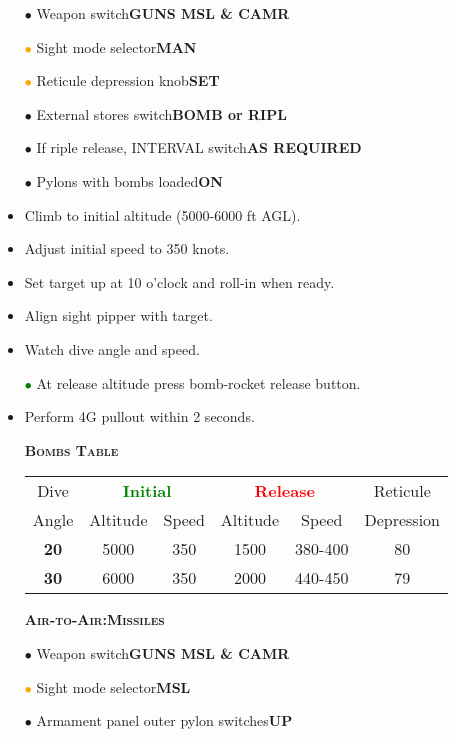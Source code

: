 \documentclass[a4paper,12pt,dvipsnames]{letter}
\newcommand{\button}[1]{\textbf{#1}}
\newcommand{\ok}[1]{\textcolor{Green}{\textbf{#1}}}
\newcommand{\warn}[1]{\textcolor{Red}{\textbf{#1}}}
\newcommand{\myHead}[1]{{\LARGE\textsc{\textbf{#1}}}}
\newcommand{\bi}{\textcolor{ProcessBlue}{$\bullet$\;}}
\newcommand{\gi}{\textcolor{Green}{$\bullet$\;}}
\newcommand{\oi}{\textcolor{Orange}{$\bullet$\;}}
\newcommand{\mcl}[2]{\multicolumn{#1}{|c|}{#2}}
\newcommand{\tb}[1]{\textbf{#1}}
\begin{document}
{\begin{itemize}
 \item[\bi] Weapon switch\dotfill\button{GUNS MSL \& CAMR}
 \item[\oi] Sight mode selector\dotfill\button{MAN}
 \item[\oi] Reticule depression knob\dotfill\button{SET}
 \item[\bi] External stores switch\dotfill\button{BOMB or RIPL}
 \item[\bi] If riple release, INTERVAL switch\dotfill\button{AS REQUIRED}
 \item[\bi] Pylons with bombs loaded\dotfill\button{ON}
 \item Climb to initial altitude (5000-6000 ft AGL).
 \item Adjust initial speed to 350 knots.
 \item Set target up at 10 o'clock and roll-in when ready.
 \item Align sight pipper with target.
 \item Watch dive angle and speed.
 \item[\gi] At release altitude press bomb-rocket release button.
 \item Perform 4G pullout within 2 seconds.
\end{itemize}
\vspace{1em}
\begin{itemize}
 \item[]\myHead{Bombs Table}
 \item[]
\begin{tabular}{c|c|c|c|c|c}
\hline
 Dive   & \mcl{2}{\ok{Initial}} & \mcl{2}{\warn{Release}} & Reticule\\
 Angle  & Altitude & Speed & Altitude & Speed   & Depression\\ \hline
\tb{20} & 5000     & 350   & 1500     & 380-400 & 80        \\ \hline
\tb{30} & 6000     & 350   & 2000     & 440-450 & 79        \\ \hline
\end{tabular}
\end{itemize}
\newpage
\begin{itemize}
 \item[] \myHead{Air-to-Air:\;Missiles}
 \item[\bi] Weapon switch\dotfill\button{GUNS MSL \& CAMR}
 \item[\oi] Sight mode selector\dotfill\button{MSL}
 \item[\bi] Armament panel outer pylon switches\dotfill\button{UP}

\end{itemize}}
\end{document}

